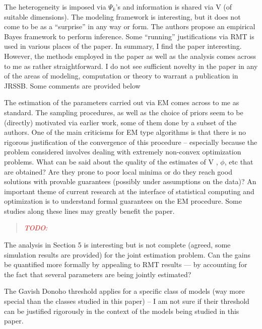 \documentclass{article}
\newenvironment{resp}{\begin{quotation}\noindent\slshape}{\end{quotation}}
\newcommand{\todo}[1]{{\textsf{\textcolor{red}{TODO: #1}}}}
\begin{document}
The heterogeneity is imposed via $\Psi_k$’s and information is shared via V (of suitable dimensions).  The modeling framework is interesting, but it does not come to be as a “surprise” in any way or form. The authors propose an empirical Bayes framework to perform inference. Some “running” justifications via RMT is used in various places of the paper.  In summary, I find the paper interesting. However, the methods employed in the paper as well as the analysis comes across to me as rather straightforward. I do not see sufficient novelty in the paper in any of the areas of modeling, computation or theory to warrant a publication in JRSSB.  Some comments are provided below

\begin{resp}
\end{resp}

The estimation of the parameters carried out via EM comes across to me as standard. The sampling procedures, as well as the choice of priors seem to be (directly) motivated via earlier work, some of them done by a subset of the authors.  One of the main criticisms for EM type algorithms is that there is no rigorous justification of the convergence of this procedure – especially because the problem considered involves dealing with extremely non-convex optimization problems. What can be said about the quality of the estimates of V , $\phi$, etc that are obtained? Are they prone to poor local minima or do they reach good solutions with provable guarantees (possibly under assumptions on the data)? An important theme of current research at the interface of statistical computing and optimization is to understand formal guarantees on the EM procedure.  Some studies along these lines may greatly benefit the paper.

\begin{resp}
\todo{}
\end{resp}

The analysis in Section 5 is interesting but is not complete (agreed, some simulation results
are provided) for the joint estimation problem. Can the gains be quantified more formally
by appealing to RMT results — by accounting for the fact that several parameters are being
jointly estimated?

\begin{resp}
\end{resp}

The Gavish Donoho threshold applies for a specific class of models (way more special than
the classes studied in this paper) – I am not sure if their threshold can be justified rigorously
in the context of the models being studied in this paper.
\end{document}
